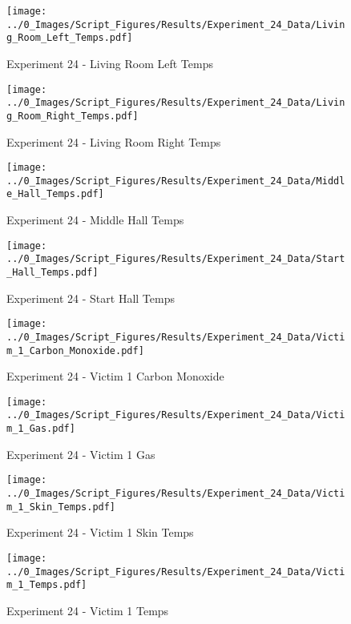 	\begin{figure}[H]
		\centering
		\texttt{[image: ../0\_Images/Script\_Figures/Results/Experiment\_24\_Data/Living\_Room\_Left\_Temps.pdf]}
		\caption[]{Experiment 24 - Living Room Left Temps}
	\end{figure}
 
	\clearpage

	\begin{figure}[H]
		\centering
		\texttt{[image: ../0\_Images/Script\_Figures/Results/Experiment\_24\_Data/Living\_Room\_Right\_Temps.pdf]}
		\caption[]{Experiment 24 - Living Room Right Temps}
	\end{figure}
 

	\begin{figure}[H]
		\centering
		\texttt{[image: ../0\_Images/Script\_Figures/Results/Experiment\_24\_Data/Middle\_Hall\_Temps.pdf]}
		\caption[]{Experiment 24 - Middle Hall Temps}
	\end{figure}
 
	\clearpage

	\begin{figure}[H]
		\centering
		\texttt{[image: ../0\_Images/Script\_Figures/Results/Experiment\_24\_Data/Start\_Hall\_Temps.pdf]}
		\caption[]{Experiment 24 - Start Hall Temps}
	\end{figure}
 

	\begin{figure}[H]
		\centering
		\texttt{[image: ../0\_Images/Script\_Figures/Results/Experiment\_24\_Data/Victim\_1\_Carbon\_Monoxide.pdf]}
		\caption[]{Experiment 24 - Victim 1 Carbon Monoxide}
	\end{figure}
 
	\clearpage

	\begin{figure}[H]
		\centering
		\texttt{[image: ../0\_Images/Script\_Figures/Results/Experiment\_24\_Data/Victim\_1\_Gas.pdf]}
		\caption[]{Experiment 24 - Victim 1 Gas}
	\end{figure}
 

	\begin{figure}[H]
		\centering
		\texttt{[image: ../0\_Images/Script\_Figures/Results/Experiment\_24\_Data/Victim\_1\_Skin\_Temps.pdf]}
		\caption[]{Experiment 24 - Victim 1 Skin Temps}
	\end{figure}
 
	\clearpage

	\begin{figure}[H]
		\centering
		\texttt{[image: ../0\_Images/Script\_Figures/Results/Experiment\_24\_Data/Victim\_1\_Temps.pdf]}
		\caption[]{Experiment 24 - Victim 1 Temps}
	\end{figure}
 


